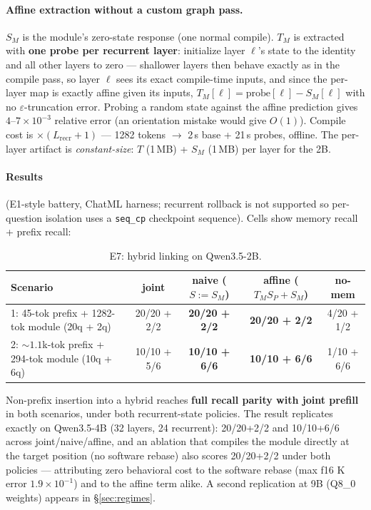 \documentclass[11pt]{article}
\newcommand{\code}[1]{\texttt{#1}}
\begin{document}
\paragraph{Affine extraction without a custom graph pass.}
$S_M$ is the module's zero-state response (one normal compile). $T_M$ is extracted with \textbf{one probe per recurrent layer}: initialize layer $\ell$'s state to the identity and all other layers to zero --- shallower layers then behave exactly as in the compile pass, so layer $\ell$ sees its exact compile-time inputs, and since the per-layer map is exactly affine given its inputs, $T_M[\ell] = \text{probe}[\ell] - S_M[\ell]$ with no $\varepsilon$-truncation error. Probing a random state against the affine prediction gives $4$--$7 \times 10^{-3}$ relative error (an orientation mistake would give $O(1)$). Compile cost is $\times(L_{\text{recr}}+1)$ --- 1282 tokens $\to$ 2\,s base + 21\,s probes, offline. The per-layer artifact is \emph{constant-size}: $T$ (1\,MB) + $S_M$ (1\,MB) per layer for the 2B.

\paragraph{Results}
(E1-style battery, ChatML harness; recurrent rollback is not supported so per-question isolation uses a \code{seq\_cp} checkpoint sequence). Cells show memory recall + prefix recall:

\begin{table}[h]
  \centering\footnotesize
  \setlength{\tabcolsep}{3.5pt}
  \caption{E7: hybrid linking on Qwen3.5-2B.}
  \begin{tabular}{lcccc}
    \toprule
    Scenario & joint & naive ($S{:=}S_M$) & affine ($T_M S_P + S_M$) & no-mem \\
    \midrule
    1: 45-tok prefix + 1282-tok module (20q + 2q) & 20/20 + 2/2 & \textbf{20/20 + 2/2} & \textbf{20/20 + 2/2} & 4/20 + 1/2 \\
    2: ${\sim}1.1$k-tok prefix + 294-tok module (10q + 6q) & 10/10 + 5/6 & \textbf{10/10 + 6/6} & \textbf{10/10 + 6/6} & 1/10 + 6/6 \\
    \bottomrule
  \end{tabular}
\end{table}

Non-prefix insertion into a hybrid reaches \textbf{full recall parity with joint prefill} in both scenarios, under both recurrent-state policies. The result replicates exactly on Qwen3.5-4B (32 layers, 24 recurrent): 20/20+2/2 and 10/10+6/6 across joint/naive/affine, and an ablation that compiles the module directly at the target position (no software rebase) also scores 20/20+2/2 under both policies --- attributing zero behavioral cost to the software rebase (max f16 K error $1.9 \times 10^{-1}$) and to the affine term alike. A second replication at 9B (Q8\_0 weights) appears in \S\ref{sec:regimes}.
\end{document}
